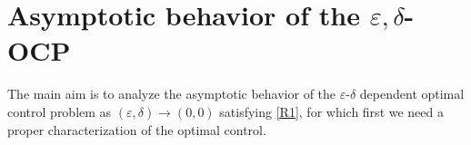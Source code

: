 \documentclass[11pt,a4paper]{article}
\numberwithin{equation}{section}
\def\wo{\overline}
\def\O{\Omega}
\def\d{\delta}
\def\e{\varepsilon}
\def\a{{\alpha}}
\def\Mc{{\mathcal{M}}}
\def\ed{{\varepsilon\delta}}
\def\wh{\widehat }
\def\Gm{{\bf m}}
\def\Gu{{\bf u}}
\def\Gw{{\bf w}}
\def\GJ{{\bf J}}
\def\GT{{\bf T}}
\def\GU{{\bf U}}
\begin{document}
\section{Asymptotic behavior of the $\e,\d$-OCP}\label{S06}
%	
	The main aim is to analyze the asymptotic behavior of the $\varepsilon$-$\d$ dependent optimal control problem as $(\e,\d)\to(0,0)$ satisfying \eqref{R1}, for which first we need a proper characterization of the optimal control.
	
\end{document}
